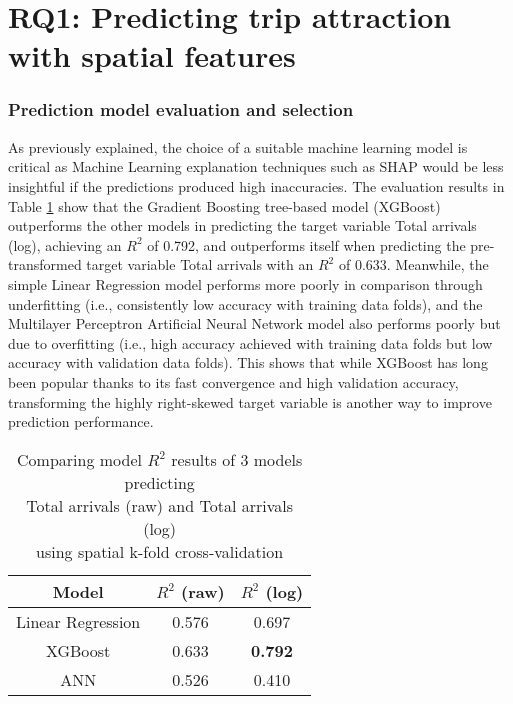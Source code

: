 \section{RQ1: Predicting trip attraction with spatial features}
\subsubsection*{Prediction model evaluation and selection}

As previously explained, the choice of a suitable machine learning model is critical as Machine Learning explanation techniques such as SHAP would be less insightful if the predictions produced high inaccuracies. The evaluation results in Table \ref{tab:modeleval} show that the Gradient Boosting tree-based model (XGBoost) outperforms the other models in predicting the target variable Total arrivals (log), achieving an $R^2$ of 0.792, and outperforms itself when predicting the pre-transformed target variable Total arrivals with an $R^2$ of 0.633. Meanwhile, the simple Linear Regression model performs more poorly in comparison through underfitting (i.e., consistently low accuracy with training data folds), and the Multilayer Perceptron Artificial Neural Network model also performs poorly but due to overfitting (i.e., high accuracy achieved with training data folds but low accuracy with validation data folds). This shows that while XGBoost has long been popular thanks to its fast convergence and high validation accuracy, transforming the highly right-skewed target variable is another way to improve prediction performance. 

\begin{table}[ht]
    \centering
    \renewcommand{\arraystretch}{1.5}
    \begin{tabular}{|c|c|c|}
        \hline
        \rowcolor{lightgray}
        \textbf{Model} & \textbf{$R^2$ (raw)} & \textbf{$R^2$ (log)} \\
        \hline
        Linear Regression & 0.576 & 0.697 \\
        \rowcolor{pink}
        XGBoost & 0.633 & \textbf{0.792} \\
        ANN & 0.526 & 0.410\\
        \hline
    \end{tabular}
    \captionsetup{justification=centering}
    \caption{Comparing model $R^2$ results of 3 models predicting \\Total arrivals (raw) and Total arrivals (log) \\using spatial k-fold cross-validation}
    \label{tab:modeleval}
\end{table}

